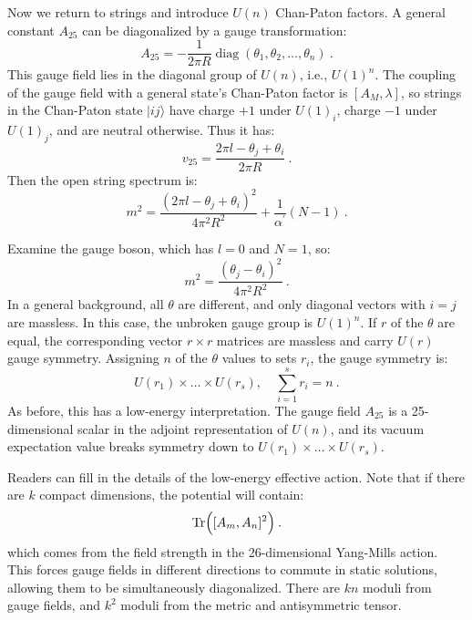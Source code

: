 Now we return to strings and introduce $U(n)$ Chan-Paton factors. 
A general constant $A_{25}$ can be diagonalized by a gauge transformation:
\begin{equation}
	A_{25}=-\frac{1}{2 \pi R} \operatorname{diag}(\theta_{1}, \theta_{2}, \ldots, \theta_{n}) \:. \label{8.6.8}
\end{equation}
This gauge field lies in the diagonal group of $U(n)$, i.e., $U(1)^{n}$. 
The coupling of the gauge field with a general state's Chan-Paton factor is $[A_{M}, \lambda]$, 
so strings in the Chan-Paton state $|i j\rangle$ have charge $+1$ under $U(1)_{i}$, charge $-1$ under $U(1)_{j}$, and are neutral otherwise. Thus it has:
\begin{equation}
	v_{25}=\frac{2 \pi l-\theta_{j}+\theta_{i}}{2 \pi R} \:. \label{8.6.9}
\end{equation}
Then the open string spectrum is:
\begin{equation}
	m^{2}=\frac{(2 \pi l-\theta_{j}+\theta_{i})^{2}}{4 \pi^{2} R^{2}}+\frac{1}{\alpha^{\prime}}(N-1) \:. \label{8.6.10}
\end{equation}

Examine the gauge boson, which has $l=0$ and $N=1$, so:
\begin{equation}
	m^{2}=\frac{(\theta_{j}-\theta_{i})^{2}}{4 \pi^{2} R^{2}} \:. \label{8.6.11}
\end{equation}
In a general background, all $\theta$ are different, and only diagonal vectors with $i=j$ are massless. 
In this case, the unbroken gauge group is $U(1)^{n} $. 
If $r$ of the $\theta$ are equal, the corresponding vector $r \times r$ matrices are massless and carry $U(r)$ gauge symmetry. 
Assigning $n$ of the $\theta$ values to sets $r_{i}$, the gauge symmetry is:
\begin{equation}
	U(r_{1}) \times \ldots \times U(r_{s}), \quad \sum_{i=1}^{s} r_{i}=n \:. \label{8.6.12}
\end{equation}
As before, this has a low-energy interpretation. 
The gauge field $A_{25}$ is a 25-dimensional scalar in the adjoint representation of $U(n)$, and its vacuum expectation value breaks symmetry down to $U(r_{1}) \times \ldots \times U(r_{s})$.

Readers can fill in the details of the low-energy effective action. Note that if there are $k$ compact dimensions, the potential will contain:
\begin{equation}
	\operatorname{Tr}\Bigl([A_{m}, A_{n}]^{2}\Bigr) \:. \label{8.6.13}
\end{equation}
which comes from the field strength in the 26-dimensional Yang-Mills action. This forces gauge fields in different directions to commute in static solutions, allowing them to be simultaneously diagonalized. There are $kn$ moduli from gauge fields, and $k^{2}$ moduli from the metric and antisymmetric tensor.


